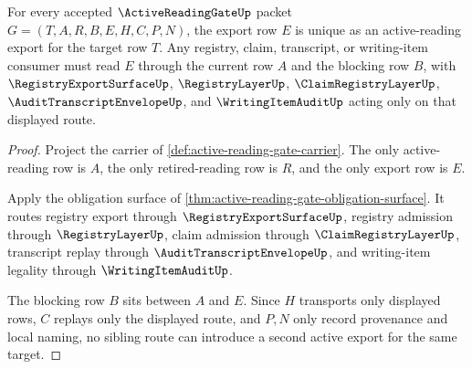 \begin{theorem}
\label{thm:active-reading-gate-export-uniqueness-obligation}
For every accepted $\ActiveReadingGateUp$ packet $G=(T,A,R,B,E,H,C,P,N)$, the export row $E$ is unique as an active-reading export for the target row $T$. Any registry, claim, transcript, or writing-item consumer must read $E$ through the current row $A$ and the blocking row $B$, with $\RegistryExportSurfaceUp$, $\RegistryLayerUp$, $\ClaimRegistryLayerUp$, $\AuditTranscriptEnvelopeUp$, and $\WritingItemAuditUp$ acting only on that displayed route.
\end{theorem}
\begin{proof}
Project the carrier of \autoref{def:active-reading-gate-carrier}. The only active-reading row is $A$, the only retired-reading row is $R$, and the only export row is $E$.

Apply the obligation surface of \autoref{thm:active-reading-gate-obligation-surface}. It routes registry export through $\RegistryExportSurfaceUp$, registry admission through $\RegistryLayerUp$, claim admission through $\ClaimRegistryLayerUp$, transcript replay through $\AuditTranscriptEnvelopeUp$, and writing-item legality through $\WritingItemAuditUp$.

The blocking row $B$ sits between $A$ and $E$. Since $H$ transports only displayed rows, $C$ replays only the displayed route, and $P,N$ only record provenance and local naming, no sibling route can introduce a second active export for the same target.
\end{proof}

